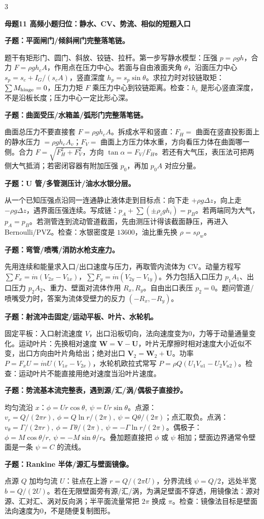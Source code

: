 \documentclass[a4paper]{article}
\newcommand{\mt}[1]{\vspace{0.22pt}\colorbox{M}{\parbox{\dimexpr\linewidth-2\fboxsep}{\color{white}\bfseries #1}}\par}
\newcommand{\qt}[1]{\vspace{0.10pt}\colorbox{Q}{\parbox{\dimexpr\linewidth-2\fboxsep}{\color{white}\bfseries #1}}\par}
\newcommand{\ans}[1]{\colorbox{G}{\parbox{\dimexpr\linewidth-2\fboxsep}{#1}}\par}
\begin{document}
\begin{multicols}{3}
\mt{母题11 高频小题归位：静水、CV、势流、相似的短题入口}
\qt{子题：平面闸门/倾斜闸门完整落笔链。}
\ans{题干有矩形门、圆门、斜放、铰链、拉杆。第一步写静水模型：压强 $p=\rho gh$，合力 $F=\rho gh_cA$，作用点在压力中心。若面与自由液面夹角 $\theta$，沿面压力中心 $s_p=s_c+I_G/(s_cA)$，竖直深度 $h_p=s_p\sin\theta$。求拉力时对铰链取矩：$\sum M_{\rm hinge}=0$，压力力矩 $F$ 乘压力中心到铰链距离。检查：$h_c$ 是形心竖直深度，不是沿板长度；压力中心一定比形心深。}
\qt{子题：曲面受压/水箱盖/弧形门完整落笔链。}
\ans{曲面总压力不要直接套 $F=\rho gh_cA$。拆成水平和竖直：$F_H=$ 曲面在竖直投影面上的静水压力 $=\rho gh_cA_v$；$F_V=$ 曲面上方压力体水重，方向看压力体在曲面哪一侧。合力 $F=\sqrt{F_H^2+F_V^2}$，方向 $\tan\alpha=F_V/F_H$。若还有大气压，表压法可把两侧大气抵消；若密闭容器有附加压强 $p_0$，再加 $p_0A$ 对应分量。}
\qt{子题：U 管/多管测压计/油水水银分层。}
\ans{从一个已知压强点沿同一连通静止液体走到目标点：向下走 $+\rho g\Delta z$，向上走 $-\rho g\Delta z$，遇界面压强连续。写成链：$p_A+\sum(\pm\rho_i g h_i)=p_B$。若两端同为大气，$p_A=p_B$。若测管连到流动管道截面，先由测压计得该截面静压，再进入 Bernoulli/PVZ。检查：水银密度是 $13600$，油比重先换 $\rho=s\rho_w$。}
\qt{子题：弯管/喷嘴/消防水枪支座力。}
\ans{先用连续和能量求入口/出口速度与压力，再取管内流体为 CV。动量方程写 $\sum F_x=\dot m(V_{2x}-V_{1x})$，$\sum F_y=\dot m(V_{2y}-V_{1y})$。外力包括入口压力 $p_1A_1$、出口压力 $p_2A_2$、重力、壁面对流体作用 $R_x,R_y$。自由出口表压 $p_2=0$。题问管道/喷嘴受力时，答案为流体受壁力的反力 $(-R_x,-R_y)$。}
\qt{子题：射流冲击固定/运动平板、叶片、水轮机。}
\ans{固定平板：入口射流速度 $V$，出口沿板切向，法向速度变为0，力等于动量通量变化。运动叶片：先换相对速度 $\bm W=\bm V-\bm U$，叶片无摩擦时相对速度大小近似不变，出口方向由叶片角给出；绝对出口 $\bm V_2=\bm W_2+\bm U$。功率 $P=F_xU=\dot m U(V_{1x}-V_{2x})$，水轮机欧拉式常写 $P=\rho Q(U_1V_{u1}-U_2V_{u2})$。检查：运动叶片不能直接用绝对速度当沿叶片速度。}
\qt{子题：势流基本流完整表，遇到源/汇/涡/偶极子直接抄。}
\ans{均匀流沿 $x$：$\phi=Ur\cos\theta,\ \psi=Ur\sin\theta$。点源：$v_r=Q/(2\pi r),\ \phi=Q\ln r/(2\pi),\ \psi=Q\theta/(2\pi)$；点汇取负。点涡：$v_\theta=\Gamma/(2\pi r),\ \phi=\Gamma\theta/(2\pi),\ \psi=-\Gamma\ln r/(2\pi)$。偶极子：$\phi=M\cos\theta/r,\ \psi=-M\sin\theta/r$。叠加题直接把 $\phi$ 或 $\psi$ 相加；壁面边界通常令壁面是一条 $\psi=C$ 的流线。}
\qt{子题：Rankine 半体/源汇与壁面镜像。}
\ans{点源 $Q$ 加均匀流 $U$：驻点在上游 $r=Q/(2\pi U)$，分界流线 $\psi=Q/2$，远处半宽 $b=Q/(2U)$。若在无限壁面旁有源/汇/涡，为满足壁面不穿透，用镜像法：源对源、汇对汇、涡对反向涡；半平面流量常把 $2\pi$ 换成 $\pi$。检查：镜像法目标是壁面法向速度为0，不是随便复制图形。}

\end{multicols}
\end{document}
